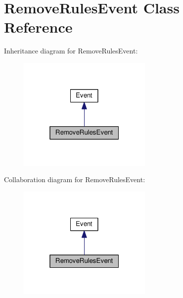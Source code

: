 \hypertarget{classRemoveRulesEvent}{}\section{Remove\+Rules\+Event Class Reference}
\label{classRemoveRulesEvent}


Inheritance diagram for Remove\+Rules\+Event\+:
\nopagebreak
\begin{figure}[H]
\begin{center}
\leavevmode
\includegraphics[width=184pt]{classRemoveRulesEvent__inherit__graph}
\end{center}
\end{figure}


Collaboration diagram for Remove\+Rules\+Event\+:
\nopagebreak
\begin{figure}[H]
\begin{center}
\leavevmode
\includegraphics[width=184pt]{classRemoveRulesEvent__coll__graph}
\end{center}
\end{figure}

